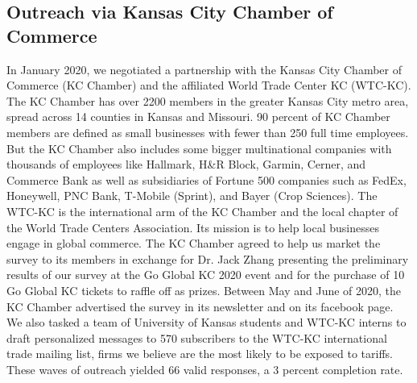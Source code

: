 \subsection{Outreach via Kansas City Chamber of Commerce}
In January 2020, we negotiated a partnership with the Kansas City Chamber of Commerce (KC Chamber) and the affiliated World Trade Center KC (WTC-KC). The KC Chamber has over 2200 members in the greater Kansas City metro area, spread across 14 counties in Kansas and Missouri. 90 percent of KC Chamber members are defined as small businesses with fewer than 250 full time employees. But the KC Chamber also includes some bigger multinational companies with thousands of employees like Hallmark, H\&R Block, Garmin, Cerner, and Commerce Bank as well as subsidiaries of Fortune 500 companies such as FedEx, Honeywell, PNC Bank, T-Mobile (Sprint), and Bayer (Crop Sciences). The WTC-KC is the international arm of the KC Chamber and the local chapter of the World Trade Centers Association. Its mission is to help local businesses engage in global commerce. The KC Chamber agreed to help us market the survey to its members in exchange for Dr. Jack Zhang presenting the preliminary results of our survey at the Go Global KC 2020 event and for the purchase of 10 Go Global KC tickets to raffle off as prizes. Between May and June of 2020, the KC Chamber advertised the survey in its newsletter and on its facebook page. We also tasked a team of University of Kansas students and WTC-KC interns to draft personalized messages to 570 subscribers to the WTC-KC international trade mailing list, firms we believe are the most likely to be exposed to tariffs. These waves of outreach yielded 66 valid responses, a 3 percent completion rate.  

